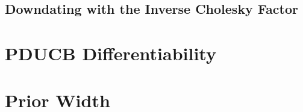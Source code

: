 \documentclass[11pt,a4paper,twoside,BCOR=15mm]{scrbook}
\begin{document}
\section{Downdating with the Inverse Cholesky Factor}\label{sec:downdating}

\chapter{PDUCB Differentiability}\label{sec:pducb-diff}

\chapter{Prior Width}\label{sec:prior}

\backmatter{}
\listoffigures{}
\printbibliography{}
\end{document}
